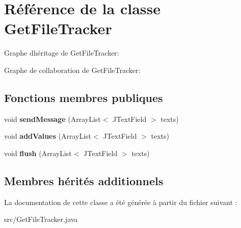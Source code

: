 \hypertarget{classGetFileTracker}{}\section{Référence de la classe Get\+File\+Tracker}
\label{classGetFileTracker}


Graphe d\textquotesingle{}héritage de Get\+File\+Tracker\+:


Graphe de collaboration de Get\+File\+Tracker\+:
\subsection*{Fonctions membres publiques}
\begin{DoxyCompactItemize}
\item 
\mbox{\label{classGetFileTracker_adfb19f788c2d781ce48e2548b5f0b268}} 
void {\bfseries send\+Message} (Array\+List$<$ J\+Text\+Field $>$ texts)
\item 
\mbox{\label{classGetFileTracker_ade6dd0170481b9703de5354f283e6ab4}} 
void {\bfseries add\+Values} (Array\+List$<$ J\+Text\+Field $>$ texts)
\item 
\mbox{\label{classGetFileTracker_affe887f62345dbc8ef3d6fa2f7c111d5}} 
void {\bfseries flush} (Array\+List$<$ J\+Text\+Field $>$ texts)
\end{DoxyCompactItemize}
\subsection*{Membres hérités additionnels}


La documentation de cette classe a été générée à partir du fichier suivant \+:\begin{DoxyCompactItemize}
\item 
src/Get\+File\+Tracker.\+java\end{DoxyCompactItemize}
